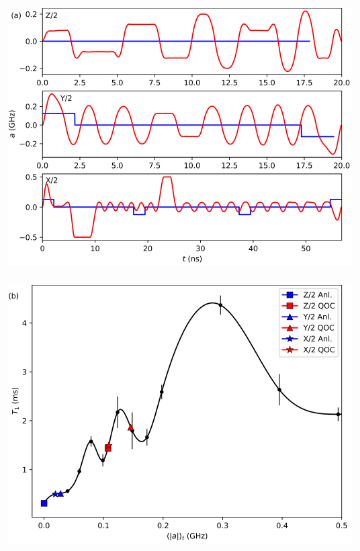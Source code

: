 \documentclass[
  amsfonts,
  amsmath,
  tbtags,
  amssymb,
  aps,
  nobibnotes,
  twocolumn,
]{revtex4-2}
\begin{document}
\begin{figure}[ht]
  \begin{subfigure}{.49\linewidth}
    \includegraphics[width=\linewidth]{assets/f1a.png}
  \end{subfigure}\hfill%
  \begin{subfigure}{.49\linewidth}
    \includegraphics[width=\linewidth]{assets/f1b.png}
  \end{subfigure}
  \begin{subfigure}{\linewidth}

\end{subfigure}
\end{figure}
\end{document}

